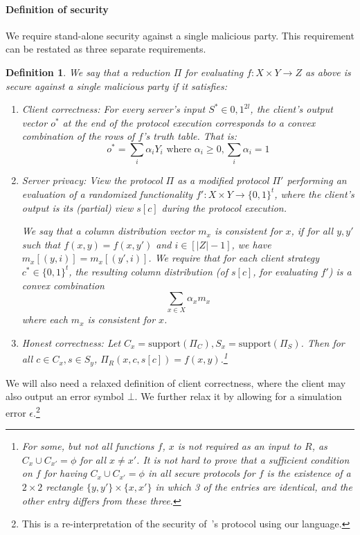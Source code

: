 \documentclass[a4paper]{article}
\newtheorem{definition}{Definition}[section]
\newcommand{\support}{\mathrm{support}}
\begin{document}
\paragraph{Definition of security}
We require stand-alone security against a single malicious party. This requirement can be restated as three separate requirements.
\begin{definition}\label{perfect-security}
We say that a reduction $\Pi$ for evaluating $f:X\times Y\rightarrow Z$ as above is secure against a single malicious party if it satisfies:
\begin{enumerate}
\item Client correctness: For every server's input $S^*\in {0,1}^{2l}$, the client's output vector $o^*$ at the end
of the protocol execution corresponds to a convex combination of the rows of $f$'s truth table. That is:
\[o^* = \sum_i \alpha_iY_i\text{ where } \alpha_i\geq 0,\sum_i\alpha_i=1\]
\item Server privacy: View the protocol $\Pi$ as a modified protocol $\Pi'$ performing an evaluation of a randomized functionality $f':X\times Y\rightarrow\{0,1\}^t$, where the client's output is its (partial) view $s[c]$ during the protocol execution. 

We say that a column distribution vector $m_x$ is consistent for $x$, if for all $y,y'$ such that $f(x,y)= f(x,y')$ and $i\in [|Z|-1]$, we have $m_x[(y,i)]=m_x[(y',i)]$. 
We require that for each client strategy $c^*\in\{0,1\}^t$, 
the resulting column distribution (of $s[c]$, for evaluating $f'$) is a convex combination
\[\sum_{x\in X} \alpha_xm_x\] where each $m_x$ is consistent for $x$.

\item Honest correctness: Let $C_x=\support(\Pi_C),S_x=\support(\Pi_S)$. Then for all $c\in C_x,s\in S_y$, $\Pi_R(x,c,s[c])=f(x,y)$.\footnote{For some, but not all functions $f$, $x$ is not required as an input to $R$, as $C_x\cup C_{x'}=\phi$ for all $x\neq x'$. It is not hard to prove that a sufficient condition on $f$ for having $C_x\cup C_{x'}=\phi$ in all secure protocols for $f$ is the existence of a $2\times 2$ rectangle $\{y,y'\}\times\{x,x'\}$ in which 3 of the entries are identical, and the other entry differs from these three.} 
\end{enumerate}
\end{definition}

We will also need a relaxed definition of client correctness, where the client may also output an error symbol $\bot$. We further relax it by allowing for a simulation error $\epsilon$.\footnote{This is a re-interpretation of the security of~\cite{IKOPS}'s protocol using our language.}
\end{document}
